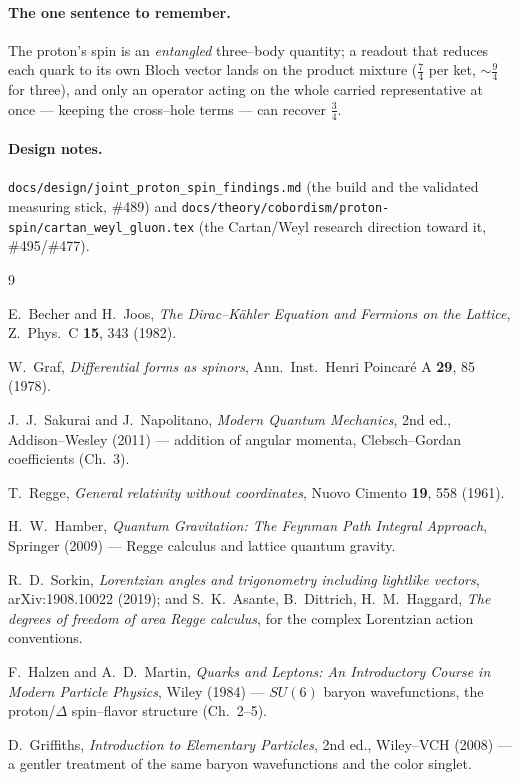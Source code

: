 \documentclass[11pt,oneside]{article}
\newcommand{\code}[1]{\texttt{#1}}
\begin{document}
\paragraph{The one sentence to remember.}
The proton's spin is an \emph{entangled} three--body quantity; a readout that
reduces each quark to its own Bloch vector lands on the product mixture
($\tfrac74$ per ket, $\sim\tfrac94$ for three), and only an operator acting on
the whole carried representative at once --- keeping the cross--hole terms ---
can recover $\tfrac34$.

\paragraph{Design notes.}
\code{docs/design/joint\_proton\_spin\_findings.md} (the build and the validated
measuring stick, \#489) and \code{docs/theory/cobordism/proton-spin/cartan\_weyl\_gluon.tex}
(the Cartan/Weyl research direction toward it, \#495/\#477).

\begin{thebibliography}{9}

 E.~Becher and H.~Joos,
  \emph{The Dirac--K\"ahler Equation and Fermions on the Lattice},
  Z.\ Phys.\ C \textbf{15}, 343 (1982).

 W.~Graf,
  \emph{Differential forms as spinors},
  Ann.\ Inst.\ Henri Poincar\'e A \textbf{29}, 85 (1978).

 J.~J.~Sakurai and J.~Napolitano,
  \emph{Modern Quantum Mechanics}, 2nd ed., Addison--Wesley (2011)
  --- addition of angular momenta, Clebsch--Gordan coefficients (Ch.~3).

 T.~Regge,
  \emph{General relativity without coordinates},
  Nuovo Cimento \textbf{19}, 558 (1961).

 H.~W.~Hamber,
  \emph{Quantum Gravitation: The Feynman Path Integral Approach},
  Springer (2009) --- Regge calculus and lattice quantum gravity.

 R.~D.~Sorkin,
  \emph{Lorentzian angles and trigonometry including lightlike vectors},
  arXiv:1908.10022 (2019); and S.~K.~Asante, B.~Dittrich, H.~M.~Haggard,
  \emph{The degrees of freedom of area Regge calculus}, for the complex
  Lorentzian action conventions.

 F.~Halzen and A.~D.~Martin,
  \emph{Quarks and Leptons: An Introductory Course in Modern Particle Physics},
  Wiley (1984) --- $SU(6)$ baryon wavefunctions, the proton/$\Delta$
  spin--flavor structure (Ch.~2--5).

 D.~Griffiths,
  \emph{Introduction to Elementary Particles}, 2nd ed., Wiley--VCH (2008)
  --- a gentler treatment of the same baryon wavefunctions and the color singlet.

\end{thebibliography}
\end{document}
